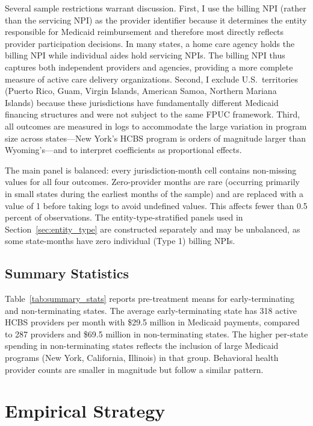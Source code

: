\documentclass[12pt]{article}
\begin{document}
Several sample restrictions warrant discussion. First, I use the billing NPI (rather than the servicing NPI) as the provider identifier because it determines the entity responsible for Medicaid reimbursement and therefore most directly reflects provider participation decisions. In many states, a home care agency holds the billing NPI while individual aides hold servicing NPIs. The billing NPI thus captures both independent providers and agencies, providing a more complete measure of active care delivery organizations. Second, I exclude U.S.\ territories (Puerto Rico, Guam, Virgin Islands, American Samoa, Northern Mariana Islands) because these jurisdictions have fundamentally different Medicaid financing structures and were not subject to the same FPUC framework. Third, all outcomes are measured in logs to accommodate the large variation in program size across states---New York's HCBS program is orders of magnitude larger than Wyoming's---and to interpret coefficients as proportional effects.

The main panel is balanced: every jurisdiction-month cell contains non-missing values for all four outcomes. Zero-provider months are rare (occurring primarily in small states during the earliest months of the sample) and are replaced with a value of 1 before taking logs to avoid undefined values. This affects fewer than 0.5 percent of observations. The entity-type-stratified panels used in Section~\ref{sec:entity_type} are constructed separately and may be unbalanced, as some state-months have zero individual (Type 1) billing NPIs.

\subsection{Summary Statistics}

Table~\ref{tab:summary_stats} reports pre-treatment means for early-terminating and non-terminating states. The average early-terminating state has 318 active HCBS providers per month with \$29.5 million in Medicaid payments, compared to 287 providers and \$69.5 million in non-terminating states. The higher per-state spending in non-terminating states reflects the inclusion of large Medicaid programs (New York, California, Illinois) in that group. Behavioral health provider counts are smaller in magnitude but follow a similar pattern.




\section{Empirical Strategy}
\end{document}
